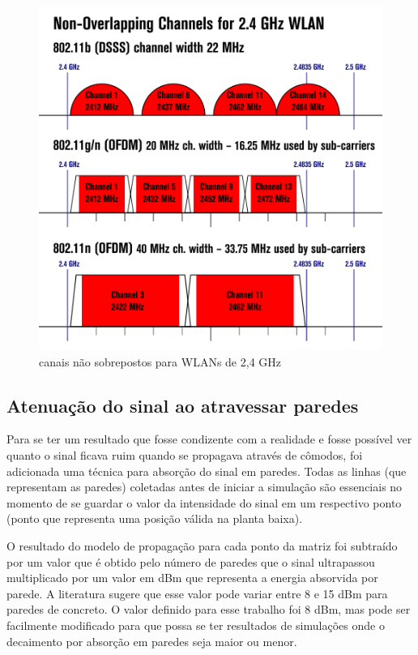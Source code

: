 \documentclass[
	12pt,				%
	openright,			%
	twoside,			%
	a4paper,			%
	english,			%
	french,				%
	spanish,			%
	brazil				%
	]{abntex2}
\begin{document}
\begin{figure}[htb]
	\caption{\label{canais} canais não sobrepostos para WLANs de 2,4 GHz}
	\begin{center}
		\includegraphics[scale=0.6]{images/canais.jpg}
	\end{center}
\end{figure}

\subsection[Atenuação do sinal ao atravessar paredes]{Atenuação do sinal ao atravessar paredes}

Para se ter um resultado que fosse condizente com a realidade e fosse possível ver quanto o sinal ficava ruim quando se propagava através de cômodos, foi adicionada uma técnica para absorção do sinal em paredes. Todas as linhas (que representam as paredes) coletadas antes de iniciar a simulação são essenciais no momento de se guardar o valor da intensidade do sinal em um respectivo ponto (ponto que representa uma posição válida na planta baixa).

O resultado do modelo de propagação para cada ponto da matriz foi subtraído por um valor que é obtido pelo número de paredes que o sinal ultrapassou multiplicado por um valor em dBm que representa a energia absorvida por parede. A literatura sugere que esse valor pode variar entre 8 e 15 dBm para paredes de concreto. O valor definido para esse trabalho foi 8 dBm, mas pode ser facilmente modificado para que possa se ter resultados de simulações onde o decaimento por absorção em paredes seja maior ou menor.
\end{document}
